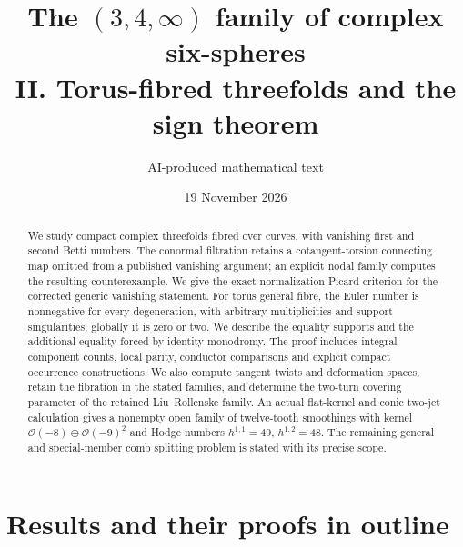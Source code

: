 
\title{The $(3,4,\infty)$ family of complex six-spheres\\[.5em]II. Torus-fibred threefolds and the sign theorem}
\author{AI-produced mathematical text}
\date{19 November 2026}
\maketitle
\begin{abstract}
We study compact complex threefolds fibred over curves, with vanishing
first and second Betti numbers. The conormal filtration retains a
cotangent-torsion connecting map omitted from a published vanishing
argument; an explicit nodal family computes the resulting
counterexample. We give the exact normalization-Picard criterion for
the corrected generic vanishing statement. For torus general fibre,
the Euler number is nonnegative for every degeneration, with
arbitrary multiplicities and support singularities; globally it is
zero or two. We describe the equality supports and the additional
equality forced by identity monodromy. The proof includes integral
component counts, local parity, conductor comparisons and explicit
compact occurrence constructions. We also compute tangent twists
and deformation spaces, retain the fibration in the stated families,
and determine the two-turn covering parameter of the retained
Liu--Rollenske family. An actual flat-kernel and conic two-jet
calculation gives a nonempty open family of twelve-tooth smoothings
with kernel $\mathcal O(-8)\oplus\mathcal O(-9)^2$ and Hodge numbers
$h^{1,1}=49$, $h^{1,2}=48$. The remaining general and special-member
comb splitting problem is stated with its precise scope.
\end{abstract}
\clearpage
\tableofcontents
\clearpage
\section{Results and their proofs in outline}\label{sec:results}

